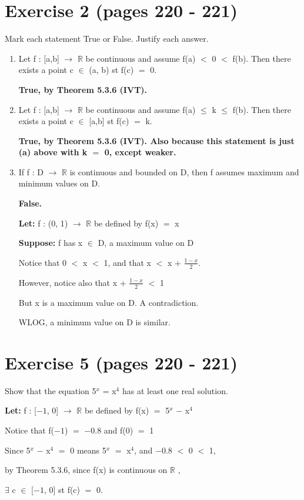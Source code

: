 \documentclass{article}
\newcommand{\mt}[1]{\ensuremath{#1}}
\newcommand\bsc[2][\DefaultOpt]{%
  \def\DefaultOpt{#2}%
  \section[#1]{#2}%
}
\newcommand{\balist}{\begin{enumerate}[label=\alph*.]}
\newcommand{\elist}{\end{enumerate}}
\newcommand{\lt}[1]{\textbf{Let: } #1}
\newcommand{\supp}[1]{\textbf{Suppose: } #1}
\newcommand{\br}{\mt{\mathbb{R}} }       %
\newcommand{\mem}{\mt{\in} }
\newcommand{\exs}{\mt{\exists} }
\newcommand{\lra}{ \mt{\longrightarrow} } %
\newcommand{\ps}{\mt{+} }
\newcommand{\ms}{\mt{-} }
\newcommand{\ls}{\mt{<} }
\newcommand{\lse}{\mt{\leq} }
\newcommand{\eql}{\mt{=} }
\newcommand{\uf}[2]{#1\mt{^{#2}}}
\newcommand{\frc}[2]{\mt{\frac{#1}{#2}}}
\begin{document}
\bsc{Exercise 2 (pages 220 - 221)}{

Mark each statement True or False. Justify each answer.

\balist
\item Let f : [a,b] \lra \br be continuous and assume f(a) \ls 0 \ls f(b). Then there exists a point c \mem (a, b) st f(c) \eql 0.

	\textbf{True, by Theorem 5.3.6 (IVT).}

\item Let f : [a,b] \lra \br be continuous and assume f(a) \lse k \lse f(b). Then there exists a point c \mem [a,b] st f(c) \eql k.

	\textbf{True, by Theorem 5.3.6 (IVT). Also because this statement is just (a) above with k \eql 0, except weaker.}
	
\item If f : D \lra \br is continuous and bounded on D, then f assumes maximum and minimum values on D.
	
	\textbf{False.}
	
	\lt{f : (0, 1) \lra \br be defined by f(x) \eql x}
	
	\supp{f has x \mem D, a maximum value on D}
	
	Notice that 0 \ls x \ls 1, and that x \ls x \ps \frc{1 - x}{2}.
	
	However, notice also that x \ps \frc{1 - x}{2} \ls 1
	
	But x is a maximum value on D. A contradiction.
	
	WLOG, a minimum value on D is similar.
	
\elist
}

\newpage

\bsc{Exercise 5 (pages 220 - 221)}{
Show that the equation \uf{5}{x} = \uf{x}{4} has at least one real solution.

\lt{f : [$-1$, 0] \lra \br be defined by f(x) \eql \uf{5}{x} \ms \uf{x}{4}}

Notice that f($-1$) \eql $-0.8$ and f(0) \eql 1

Since \uf{5}{x} \ms \uf{x}{4} \eql 0 means \uf{5}{x} \eql \uf{x}{4}, and $-0.8$ \ls 0 \ls 1,

by Theorem 5.3.6, since f(x) is continuous on \br,

\exs c \mem [$-1$, 0] st f(c) \eql 0.

}
\end{document}
